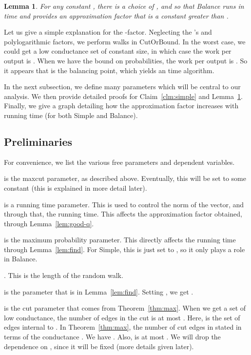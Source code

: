 \documentclass[11pt]{article}
\newtheorem{Lem}[theorem]{Lemma}
\newcommand\Balance{{\sc Balance}\xspace}
\newcommand\Simple{{\sc Simple}\xspace}
\newcommand\CutOrBound{{\sc CutOrBound}\xspace}
\begin{document}
\begin{Lem} \label{lem:balance}
For any constant , there is a choice of ,  and
 so that {\Balance} runs in  time and provides
an approximation factor that is a constant greater than .
\end{Lem}

Let us give a simple explanation for the -factor. Neglecting the 's and
polylogarithmic factors, we perform  walks in {\CutOrBound}. In
the worst case, we could get a low conductance set of constant size, in which
case the work per output is . When we have the  bound on
probabilities, the work per output is . So it appears that  is the balancing point, which yields an  time
algorithm.

In the next subsection, we define many parameters
which will be central to our analysis.
We then provide detailed proofs for Claim~\ref{clm:simple} and
Lemma~\ref{lem:balance}. Finally, we give a graph
detailing how the approximation factor increases with
running time (for both {\Simple} and {\Balance}).


\subsection{Preliminaries} \label{app:algo}

For convenience, we list the various free parameters and dependent variables.
\begin{itemize*}
	\item  is the maxcut parameter, as described above. Eventually, this will be set
	to some constant (this is explained in more detail later).
	\item  is a running time parameter. This is used to control the norm
	of the  vector, and through that, the running time. This affects the approximation
	factor obtained, through Lemma~\ref{lem:good-q}.
	\item  is the maximum probability parameter. This directly affects the running
	time through Lemma~\ref{lem:find}. For {\Simple}, this is just set to , so it
	only plays a role in {\Balance}.
	\item . This is the
	length of the random walk.
	\item  is the parameter that is in Lemma~\ref{lem:find}. Setting
	, we get .
	\item  is the cut parameter that comes from Theorem~\ref{thm:max}.
	When we get a set  of low conductance, the number of edges in the cut
	is at most . Here,  is the set
	of edges internal to . In Theorem~\ref{thm:max}, the number
	of cut edges in stated in terms of the conductance . We have
	. Also,  is at most .
	We will drop the dependence on , since it will be fixed (more details
	given later).
\end{itemize*}
\end{document}
